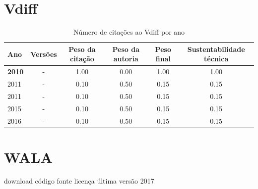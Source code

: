 \section{Vdiff}


\begin{table}[H]
\caption{Número de citações ao Vdiff por ano}
\centering
\begin{tabular}{| l | c | c | c | c | c |}
  \hline
  Ano & Versões & Peso da citação & Peso da autoria & Peso final & Sustentabilidade técnica \\
  \hline
            {\bf 2010}
          &
          -
          &
          1.00
          &
          0.00
          &
          1.00
          &
            {\color{blue} 1.00}
          \\
\hline
            2011
          &
          -
          &
          0.10
          &
          0.50
          &
          0.15
          &
            {\color{red} 0.15}
          \\
            2011
          &
          -
          &
          0.10
          &
          0.50
          &
          0.15
          &
            {\color{red} 0.15}
          \\
\hline
            2015
          &
          -
          &
          0.10
          &
          0.50
          &
          0.15
          &
            {\color{red} 0.15}
          \\
\hline
            2016
          &
          -
          &
          0.10
          &
          0.50
          &
          0.15
          &
            {\color{red} 0.15}
          \\
\hline
\end{tabular}
\end{table}



\section{WALA}
\checkmark download
\checkmark código fonte
\checkmark licença
\checkmark última versão 2017


